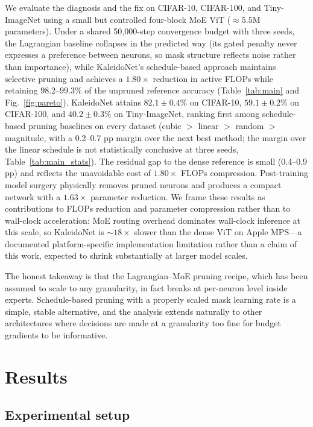 \documentclass[fleqn,10pt]{article}
\begin{document}
We evaluate the diagnosis and the fix on CIFAR-10, CIFAR-100, and
Tiny-ImageNet using a small but controlled four-block MoE ViT
(${\approx}5.5$M parameters). Under a shared 50{,}000-step convergence budget
with three seeds, the Lagrangian baseline collapses in the predicted
way (its gated penalty never expresses a preference between neurons,
so mask structure reflects noise rather than importance), while KaleidoNet's
schedule-based approach maintains selective pruning and achieves a
$1.80\times$ reduction in active FLOPs while retaining $98.2$--$99.3\%$
of the unpruned reference accuracy (Table~\ref{tab:main} and
Fig.~\ref{fig:pareto}). KaleidoNet attains $82.1\pm0.4\%$ on
CIFAR-10, $59.1\pm0.2\%$ on CIFAR-100, and $40.2\pm0.3\%$ on
Tiny-ImageNet, ranking first among schedule-based pruning baselines
on every dataset (cubic $>$ linear $>$ random $>$ magnitude, with a
0.2--0.7 pp margin over the next best method; the margin over the
linear schedule is not statistically conclusive at three seeds,
Table~\ref{tab:main_stats}). The residual gap to the
dense reference is small (0.4--0.9 pp) and reflects the unavoidable
cost of $1.80\times$ FLOPs compression. Post-training model surgery
physically removes pruned neurons and produces a compact network
with a $1.63\times$ parameter reduction. We frame these results as
contributions to FLOPs reduction and parameter compression rather
than to wall-clock acceleration: MoE routing overhead dominates
wall-clock inference at this scale, so KaleidoNet is $\sim\!18\times$
slower than the dense ViT on Apple MPS---a documented
platform-specific implementation limitation rather than a claim of
this work, expected to shrink substantially at larger model scales.

The honest takeaway is that the Lagrangian--MoE pruning recipe, which
has been assumed to scale to any granularity, in fact breaks at
per-neuron level inside experts. Schedule-based pruning with a
properly scaled mask learning rate is a simple, stable alternative, and the analysis extends
naturally to other architectures where decisions are made at a
granularity too fine for budget gradients to be informative.

\section*{Results}
\label{sec:results}

\subsection*{Experimental setup}
\end{document}
